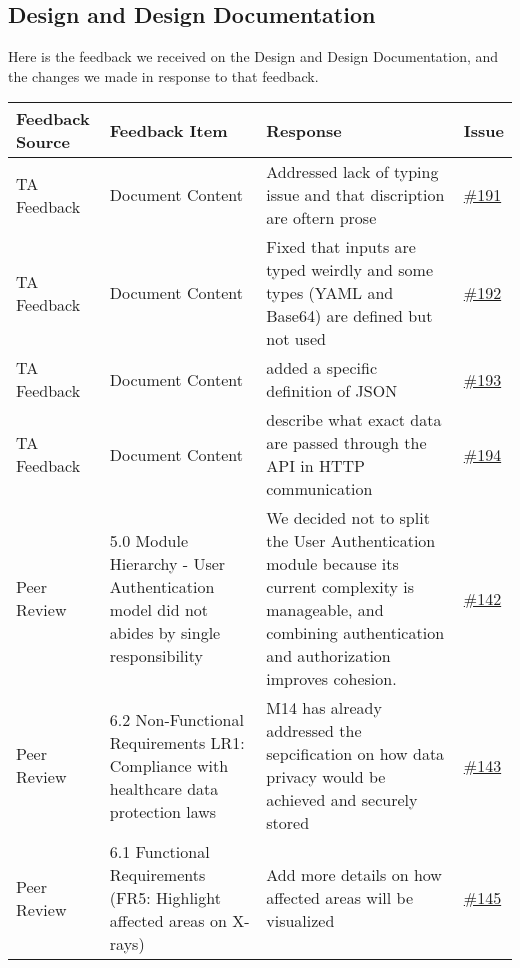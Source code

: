 \documentclass{article}
\begin{document}
\begin{longtable}{| p{} | p{} | p{} | p{} |}
    

\end{longtable}

\subsection{Design and Design Documentation}

Here is the feedback we received on the Design and Design Documentation, and the changes we made in response to that feedback.
\begin{longtable}{| p{} | p{} | p{} | p{} |}
\hline
\textbf{Feedback Source} & \textbf{Feedback Item} & \textbf{Response} & \textbf{Issue} \\
\hline
TA Feedback & Document Content & Addressed lack of typing issue and that discription are oftern prose  & \href{https://github.com/RezaJodeiri/CXR-Capstone/issues/191}{\#191} \\
\hline
TA Feedback & Document Content & Fixed that inputs are typed weirdly and some types (YAML and Base64) are defined but not used & \href{https://github.com/RezaJodeiri/CXR-Capstone/issues/192}{\#192} \\
\hline
TA Feedback & Document Content & added a specific definition of JSON & \href{https://github.com/RezaJodeiri/CXR-Capstone/issues/193}{\#193} \\
\hline
TA Feedback & Document Content & describe what exact data are passed through the API in HTTP communication & \href{https://github.com/RezaJodeiri/CXR-Capstone/issues/194}{\#194} \\
\hline
Peer Review & 5.0 Module Hierarchy - User Authentication model did not abides by single responsibility & We decided not to split the User Authentication module because its current complexity is manageable, and combining authentication and authorization improves cohesion. &\href{https://github.com/RezaJodeiri/CXR-Capstone/issues/142}{\#142}\\
\hline
Peer Review & 6.2 Non-Functional Requirements LR1: Compliance with healthcare data protection laws & M14 has already addressed the sepcification on how data privacy would be achieved and securely stored & \href{https://github.com/RezaJodeiri/CXR-Capstone/issues/143}{\#143}\\
\hline
Peer Review & 6.1 Functional Requirements (FR5: Highlight affected areas on X-rays) & Add more details on how affected areas will be visualized & \href{https://github.com/RezaJodeiri/CXR-Capstone/issues/145}{\#145} \\
\hline
\end{longtable}
\end{document}
